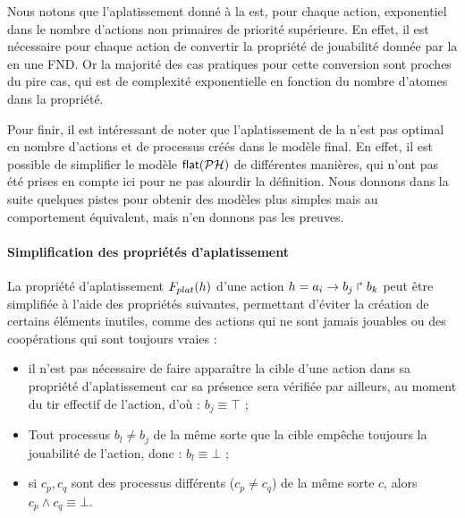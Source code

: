 Nous notons que l'aplatissement donné à la 
est, pour chaque action, exponentiel dans le nombre d'actions non primaires de
priorité supérieure.
En effet, il est nécessaire pour chaque action de convertir la propriété de jouabilité
donnée par la  en une FND.
Or la majorité des cas pratiques pour cette conversion sont proches du pire cas,
qui est de complexité exponentielle en fonction du nombre d'atomes dans la propriété.

Pour finir, il est intéressant de noter que l'aplatissement de la 
n'est pas optimal en nombre d'actions et de processus créés dans le modèle final.
En effet, il est possible de simplifier le modèle $\mathsf{flat}(\mathcal{PH})$ de différentes manières,
qui n'ont pas été prises en compte ici pour ne pas alourdir la définition.
Nous donnons dans la suite quelques pistes pour obtenir des modèles plus simples
mais au comportement équivalent, mais n'en donnons pas les preuves.

\paragraph{Simplification des propriétés d'aplatissement}
La propriété d'aplatissement $F_{plat}(h)$ d'une action $h = a_i\rightarrow b_j\Rsh b_k$ peut être
simplifiée à l'aide des propriétés suivantes, permettant d'éviter la création
de certains éléments inutiles, comme des actions qui ne sont jamais jouables
ou des coopérations qui sont toujours vraies :
\begin{itemize}
  \item il n'est pas nécessaire de faire apparaître la cible d'une action dans
    sa propriété d'aplatissement car sa présence sera vérifiée par ailleurs,
    au moment du tir effectif de l'action,
    d'où : $b_j \equiv \top$ ;
  \item Tout processus $b_l \neq b_j$ de la même sorte que la cible empêche toujours la jouabilité
    de l'action, donc : $b_l \equiv \bot$ ;
  \item si $c_p, c_q$ sont des processus différents ($c_p \neq c_q$) de la même sorte $c$,
    alors $c_p \wedge c_q \equiv \bot$.
\end{itemize}

